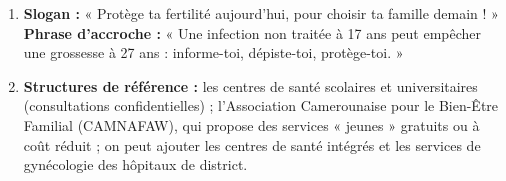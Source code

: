 \documentclass[11pt]{article}
\begin{document}
\begin{corrige}
\begin{enumerate}
\begin{itemize}
        \item \emph{Nutritionnelle :} dénutrition sévère ou obésité $\rightarrow$ perturbation de la pulsatilité de la GnRH $\rightarrow$ anovulation, aménorrhée ; carences $\rightarrow$ altération de la qualité des gamètes.
    \end{itemize}
    \item \textbf{Slogan :} « Protège ta fertilité aujourd'hui, pour choisir ta famille demain ! » \textbf{Phrase d'accroche :} « Une infection non traitée à 17 ans peut empêcher une grossesse à 27 ans : informe-toi, dépiste-toi, protège-toi. »
    \item \textbf{Structures de référence :} les centres de santé scolaires et universitaires (consultations confidentielles) ; l'Association Camerounaise pour le Bien-Être Familial (CAMNAFAW), qui propose des services « jeunes » gratuits ou à coût réduit ; on peut ajouter les centres de santé intégrés et les services de gynécologie des hôpitaux de district.
\end{enumerate}
\end{corrige}
\end{document}
